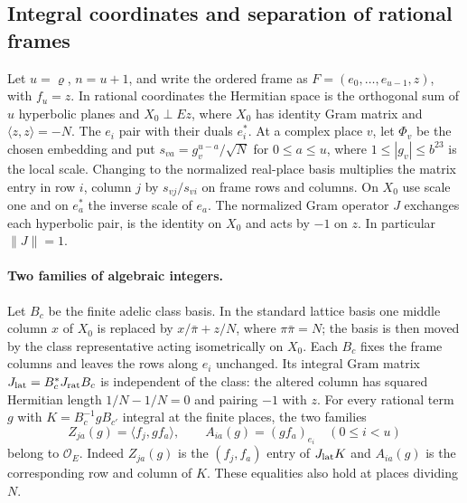 \subsection{Integral coordinates and separation of rational frames}
\label{moment:rigidity}
Let $u=\varrho$, $n=u+1$, and write the ordered frame as
$F=(e_0,\ldots,e_{u-1},z)$, with $f_u=z$. In rational coordinates the Hermitian
space is the orthogonal sum of $u$ hyperbolic planes and $X_0\perp Ez$,
where $X_0$ has identity Gram matrix and $\langle z,z\rangle=-N$.
The $e_i$ pair with their duals $e_i^*$. At a complex place $v$, let
$\Phi_v$ be the chosen embedding and put $s_{va}=g_v^{u-a}/\sqrt N$ for
$0\le a\le u$, where $1\le |g_v|\le b^{23}$ is the local scale.
Changing to the normalized real-place basis multiplies the matrix entry
in row $i$, column $j$ by $s_{vj}/s_{vi}$ on frame rows and columns.
On $X_0$ use scale one and on $e_a^*$ the inverse scale of $e_a$.
The normalized Gram operator $J$ exchanges each hyperbolic pair, is the
identity on $X_0$ and acts by $-1$ on $z$. In particular $\|J\|=1$.

\paragraph{Two families of algebraic integers.}
Let $B_c$ be the finite adelic class basis. In the standard lattice basis
one middle column $x$ of $X_0$ is replaced by $x/\bar\pi+z/N$,
where $\pi\bar\pi=N$; the basis is then moved by the class representative
acting isometrically on $X_0$. Each $B_c$ fixes the frame columns and
leaves the rows along $e_i$ unchanged. Its integral Gram matrix
$J_{\rm lat}=B_c^*J_{\rm rat}B_c$ is independent of the class:
the altered column has squared Hermitian length $1/N-1/N=0$
and pairing $-1$ with $z$. For every rational term $g$ with
$K=B_c^{-1}gB_{c'}$ integral at the finite places, the two families
\[
 Z_{ja}(g)=\langle f_j,g f_a\rangle,\qquad
 A_{ia}(g)=(g f_a)_{e_i}\quad(0\le i<u)
\]
belong to $\mathcal O_E$. Indeed $Z_{ja}(g)$ is the $(f_j,f_a)$ entry
of $J_{\rm lat}K$ and $A_{ia}(g)$ is the corresponding row and
column of $K$. These equalities also hold at places dividing $N$.

